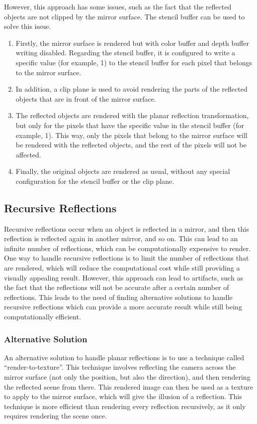 However, this approach has some issues, such as the fact that the reflected objects are not clipped by the mirror surface. The stencil buffer can be used to solve this issue.
\begin{enumerate}
    \item Firstly, the mirror surface is rendered but with color buffer and depth buffer writing disabled. Regarding the stencil buffer, it is configured to write a specific value (for example, 1) to the stencil buffer for each pixel that belongs to the mirror surface.
    \item In addition, a clip plane is used to avoid rendering the parts of the reflected objects that are in front of the mirror surface.
    \item The reflected objects are rendered with the planar reflection transformation, but only for the pixels that have the specific value in the stencil buffer (for example, 1). This way, only the pixels that belong to the mirror surface will be rendered with the reflected objects, and the rest of the pixels will not be affected.
    \item Finally, the original objects are rendered as usual, without any special configuration for the stencil buffer or the clip plane.
\end{enumerate}

\subsection{Recursive Reflections}

Recursive reflections occur when an object is reflected in a mirror, and then this reflection is reflected again in another mirror, and so on. This can lead to an infinite number of reflections, which can be computationally expensive to render. One way to handle recursive reflections is to limit the number of reflections that are rendered, which will reduce the computational cost while still providing a visually appealing result. However, this approach can lead to artifacts, such as the fact that the reflections will not be accurate after a certain number of reflections. This leads to the need of finding alternative solutions to handle recursive reflections which can provide a more accurate result while still being computationally efficient.

\subsubsection{Alternative Solution}
An
 alternative solution to handle planar reflections is to use a technique called ``render-to-texture''. This technique involves reflecting the camera across the mirror surface (not only the position, but also the direction), and then rendering the reflected scene from there. This rendered image can then be used as a texture to apply to the mirror surface, which will give the illusion of a reflection. This technique is more efficient than rendering every reflection recursively, as it only requires rendering the scene once. 


